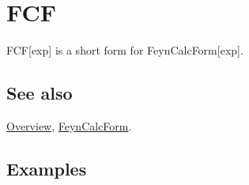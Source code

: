 \documentclass[../FeynCalcManual.tex]{subfiles}
\begin{document}
\hypertarget{fcf}{%
\section{FCF}\label{fcf}}

FCF{[}exp{]} is a short form for FeynCalcForm{[}exp{]}.

\subsection{See also}

\hyperlink{toc}{Overview}, \hyperlink{feyncalcform}{FeynCalcForm}.

\subsection{Examples}
\end{document}

